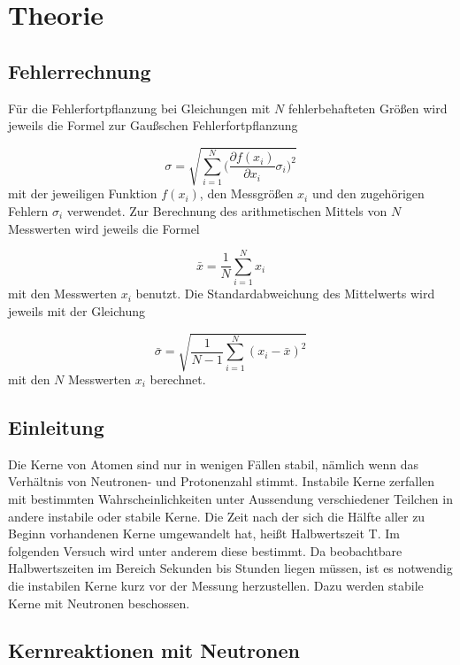 \section{Theorie}
\label{sec:Theorie}

\subsection{Fehlerrechnung}

Für die Fehlerfortpflanzung bei Gleichungen mit $N$ fehlerbehafteten Größen
wird jeweils die Formel zur Gaußschen Fehlerfortpflanzung

\begin{equation}
  \sigma = \sqrt{\sum_{i=1}^{N}\biggl(\frac{\partial f(x_i)}{\partial x_i}
  \sigma_i\biggr)^2}
\end{equation}
mit der jeweiligen Funktion $f(x_i)$, den Messgrößen $x_i$ und den
zugehörigen Fehlern $\sigma_i$ verwendet.
Zur Berechnung des arithmetischen Mittels von $N$ Messwerten wird jeweils die
Formel

\begin{equation}
  \bar{x} = \frac{1}{N}\sum_{i=1}^{N}x_i
\end{equation}
mit den Messwerten $x_i$ benutzt.
Die Standardabweichung des Mittelwerts wird jeweils mit der Gleichung

\begin{equation}
  \bar{\sigma} = \sqrt{\frac{1}{N-1}\sum_{i=1}^{N}(x_i - \bar{x})^2}
\end{equation}
mit den $N$ Messwerten $x_i$ berechnet.

\subsection{Einleitung}

Die Kerne von Atomen sind nur in wenigen Fällen stabil, nämlich wenn das Verhältnis
von Neutronen- und Protonenzahl stimmt. Instabile Kerne zerfallen mit bestimmten
Wahrscheinlichkeiten unter Aussendung verschiedener Teilchen in andere
instabile oder stabile Kerne. Die Zeit nach der sich die Hälfte aller zu Beginn
vorhandenen Kerne umgewandelt hat, heißt Halbwertszeit T. Im folgenden Versuch wird
unter anderem diese bestimmt. Da beobachtbare Halbwertszeiten im Bereich Sekunden bis
Stunden liegen müssen, ist es notwendig die instabilen Kerne kurz vor der Messung
herzustellen. Dazu werden stabile Kerne mit Neutronen beschossen.

\subsection{Kernreaktionen mit Neutronen}

